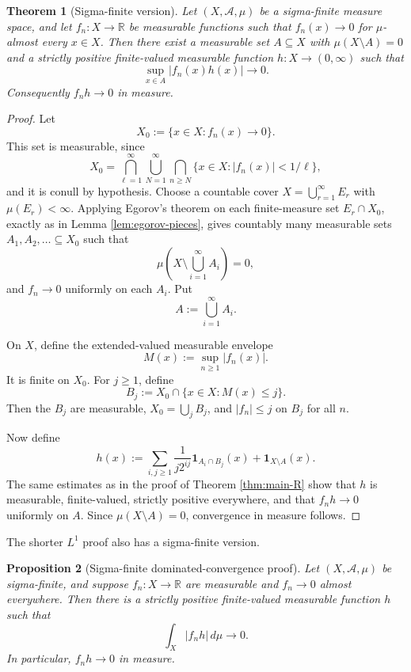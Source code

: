 \documentclass[11pt]{article}
\newcommand{\R}{\mathbb{R}}
\newcommand{\one}{\mathbf 1}
\newcommand{\mc}[1]{\mathcal{#1}}
\theoremstyle{plain}
\newtheorem{theorem}{Theorem}[section]
\newtheorem{proposition}[theorem]{Proposition}
\theoremstyle{definition}
\theoremstyle{remark}
\begin{document}
\begin{theorem}[Sigma-finite version]\label{thm:sigma-finite}
Let $(X,\mc A,\mu)$ be a sigma-finite measure space, and let
$f_n:X\to\R$ be measurable functions such that $f_n(x)\to 0$ for
$\mu$-almost every $x\in X$.  Then there exist a measurable set $A\subseteq X$
with $\mu(X\setminus A)=0$ and a strictly positive finite-valued measurable
function $h:X\to(0,\infty)$ such that
\[
        \sup_{x\in A}|f_n(x)h(x)|\longrightarrow 0.
\]
Consequently $f_nh\to 0$ in measure.
\end{theorem}

\begin{proof}
Let
\[
        X_0:=\{x\in X:f_n(x)\to 0\}.
\]
This set is measurable, since
\[
        X_0=
        \bigcap_{\ell=1}^\infty
        \bigcup_{N=1}^\infty
        \bigcap_{n\geq N}\{x\in X:|f_n(x)|<1/\ell\},
\]
and it is conull by hypothesis.  Choose a countable cover
$X=\bigcup_{r=1}^\infty E_r$ with $\mu(E_r)<\infty$.  Applying Egorov's
theorem on each finite-measure set $E_r\cap X_0$, exactly as in
Lemma \ref{lem:egorov-pieces}, gives countably many measurable sets
$A_1,A_2,\dots\subseteq X_0$ such that
\[
        \mu\left(X\setminus \bigcup_{i=1}^\infty A_i\right)=0,
\]
and $f_n\to 0$ uniformly on each $A_i$.  Put
\[
        A:=\bigcup_{i=1}^\infty A_i.
\]

On $X$, define the extended-valued measurable envelope
\[
        M(x):=\sup_{n\geq 1}|f_n(x)|.
\]
It is finite on $X_0$.  For $j\geq 1$, define
\[
        B_j:=X_0\cap\{x\in X:M(x)\leq j\}.
\]
Then the $B_j$ are measurable, $X_0=\bigcup_j B_j$, and
$|f_n|\leq j$ on $B_j$ for all $n$.

Now define
\[
        h(x)
        :=
        \sum_{i,j\geq 1}\frac{1}{j2^{ij}}\one_{A_i\cap B_j}(x)
        +\one_{X\setminus A}(x).
\]
The same estimates as in the proof of Theorem \ref{thm:main-R} show that
$h$ is measurable, finite-valued, strictly positive everywhere, and that
$f_nh\to 0$ uniformly on $A$.  Since $\mu(X\setminus A)=0$, convergence in
measure follows.
\end{proof}

The shorter $L^1$ proof also has a sigma-finite version.

\begin{proposition}[Sigma-finite dominated-convergence proof]\label{prop:l1-sigma-finite}
Let $(X,\mc A,\mu)$ be sigma-finite, and suppose $f_n:X\to\R$ are measurable
and $f_n\to 0$ almost everywhere.  Then there is a strictly positive
finite-valued measurable function $h$ such that
\[
        \int_X |f_nh|\,d\mu\longrightarrow 0.
\]
In particular, $f_nh\to 0$ in measure.
\end{proposition}
\end{document}
